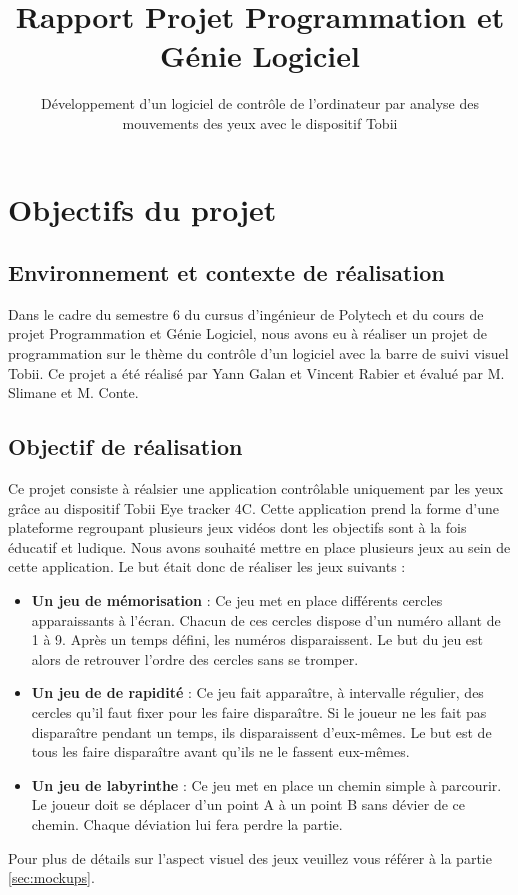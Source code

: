 \documentclass{polytech/polytech}
\title{Rapport Projet Programmation et Génie Logiciel}
\subtitle{Développement d’un logiciel de contrôle de l’ordinateur par analyse des mouvements des yeux avec le dispositif Tobii}
\begin{document}
\chapter{Objectifs du projet} 
\section{Environnement et contexte de réalisation}
Dans le cadre du semestre 6 du cursus d'ingénieur de Polytech et du cours de projet Programmation et Génie Logiciel, nous avons eu à réaliser un projet de programmation sur le thème du contrôle d'un logiciel avec la barre de suivi visuel Tobii. Ce projet a été réalisé par Yann Galan et Vincent Rabier et évalué par M. Slimane et M. Conte.

\section{Objectif de réalisation}
Ce projet consiste à réalsier une application contrôlable uniquement par les yeux grâce au dispositif Tobii Eye tracker 4C.
Cette application prend la forme d'une plateforme regroupant plusieurs jeux vidéos dont les objectifs sont à la fois éducatif et ludique. Nous avons souhaité mettre en place plusieurs jeux au sein de cette application. Le but était donc de réaliser les jeux suivants :
\begin{itemize}
\item \textbf{Un jeu de mémorisation} : Ce jeu met en place différents cercles apparaissants à l'écran. Chacun de ces cercles dispose d'un numéro allant de 1 à 9. Après un temps défini, les numéros disparaissent. Le but du jeu est alors de retrouver l'ordre des cercles sans se tromper.
\item \textbf{Un jeu de de rapidité} : Ce jeu fait apparaître, à intervalle régulier, des cercles qu'il faut fixer pour les faire disparaître. Si le joueur ne les fait pas disparaître pendant un temps, ils disparaissent d'eux-mêmes. Le but est de tous les faire disparaître avant qu'ils ne le fassent eux-mêmes.
\item \textbf{Un jeu de labyrinthe} : Ce jeu met en place un chemin simple à parcourir. Le joueur doit se déplacer d'un point A à un point B sans dévier de ce chemin. Chaque déviation lui fera perdre la partie. 
\end{itemize}

Pour plus de détails sur l'aspect visuel des jeux veuillez vous référer à la partie \autoref{sec:mockups}.
\end{document}
